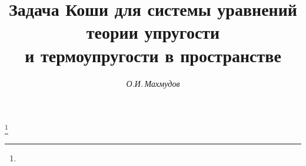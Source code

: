 

 


%  


\newcommand{\Grad}{\operatorname{grad}} 


\newcommand{\Div}{\operatorname{div}} 


\newcommand{\const}{\operatorname{const}} 


\newcommand{\im}{\operatorname{Im}} 


\newcommand{\tts}[1]{} 


 


 




\setcounter{page}{43} 












 


\author{\it О.И.\,Махмудов} 




\title{Задача Коши для системы уравнений теории упругости\\ 


и термоупругости в пространстве} 


\thanks{} 


 


 


\date{} 




\pagestyle{plain} %


